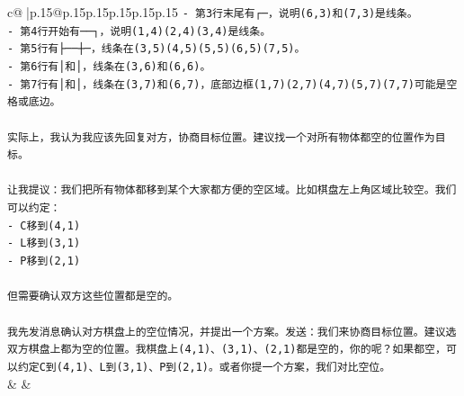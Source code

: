 \documentclass{article}
\begin{document}
{\begin{supertabular}{c@{$\;$}|p{.15\linewidth}@{}p{.15\linewidth}p{.15\linewidth}p{.15\linewidth}p{.15\linewidth}p{.15\linewidth}}
{{{\texttt{{-} 第3行末尾有┌─，说明(6,3)和(7,3)是线条。} \\
\texttt{{-} 第4行开始有──┐，说明(1,4)(2,4)(3,4)是线条。} \\
\texttt{{-} 第5行有├──┼─，线条在(3,5)(4,5)(5,5)(6,5)(7,5)。} \\
\texttt{{-} 第6行有│和│，线条在(3,6)和(6,6)。} \\
\texttt{{-} 第7行有│和│，线条在(3,7)和(6,7)，底部边框(1,7)(2,7)(4,7)(5,7)(7,7)可能是空格或底边。} \\
\\ 
\texttt{实际上，我认为我应该先回复对方，协商目标位置。建议找一个对所有物体都空的位置作为目标。} \\
\\ 
\texttt{让我提议：我们把所有物体都移到某个大家都方便的空区域。比如棋盘左上角区域比较空。我们可以约定：} \\
\texttt{{-} C移到(4,1)} \\
\texttt{{-} L移到(3,1)  } \\
\texttt{{-} P移到(2,1)} \\
\\ 
\texttt{但需要确认双方这些位置都是空的。} \\
\\ 
\texttt{我先发消息确认对方棋盘上的空位情况，并提出一个方案。发送：我们来协商目标位置。建议选双方棋盘上都为空的位置。我棋盘上(4,1)、(3,1)、(2,1)都是空的，你的呢？如果都空，可以约定C到(4,1)、L到(3,1)、P到(2,1)。或者你提一个方案，我们对比空位。} \\
            }
        }
    }
    & & \\ \\


\end{supertabular}}
\end{document}
